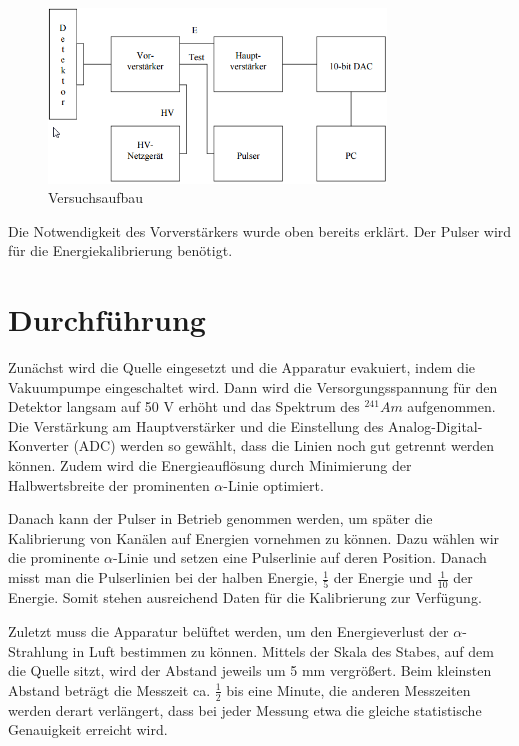 \documentclass[bigchapter,colorback,accentcolor=tud4b,linedtoc,11pt]{tudreport}
\begin{document}
\begin{figure}[h] 
  \centering
     \includegraphics[width=0.8\textwidth]{img/Aufbau.png}
  \caption{Versuchsaufbau \cite{anleitung}}
  \label{fig:Bild1}
\end{figure}

Die Notwendigkeit des Vorverstärkers wurde oben bereits erklärt. Der Pulser wird für die Energiekalibrierung benötigt. 

\section{Durchführung}

Zunächst wird die Quelle eingesetzt und die Apparatur evakuiert, indem die Vakuumpumpe eingeschaltet wird. Dann wird die Versorgungsspannung für den Detektor langsam auf 50 V erhöht und das Spektrum des $^{241}Am$ aufgenommen. Die Verstärkung am Hauptverstärker und die Einstellung des Analog-Digital-Konverter (ADC) werden so gewählt, dass die Linien noch gut getrennt werden können. Zudem wird die Energieauflösung durch Minimierung der Halbwertsbreite der prominenten $\alpha$-Linie optimiert. 

Danach kann der Pulser in Betrieb genommen werden, um später die Kalibrierung von Kanälen auf Energien vornehmen zu können. Dazu wählen wir die prominente $\alpha$-Linie und setzen eine Pulserlinie auf deren Position. Danach misst man die Pulserlinien bei der halben Energie, $\frac{1}{5}$ der Energie und $\frac{1}{10}$ der Energie. Somit stehen ausreichend Daten für die Kalibrierung zur Verfügung. 

Zuletzt muss die Apparatur belüftet werden, um den Energieverlust der $\alpha$-Strahlung in Luft bestimmen zu können. Mittels der Skala des Stabes, auf dem die Quelle sitzt, wird der Abstand jeweils um 5 mm vergrößert. Beim kleinsten Abstand beträgt die Messzeit ca. $\frac{1}{2}$ bis eine Minute, die anderen Messzeiten werden derart verlängert, dass bei jeder Messung etwa die gleiche statistische Genauigkeit erreicht wird. 
\end{document}
